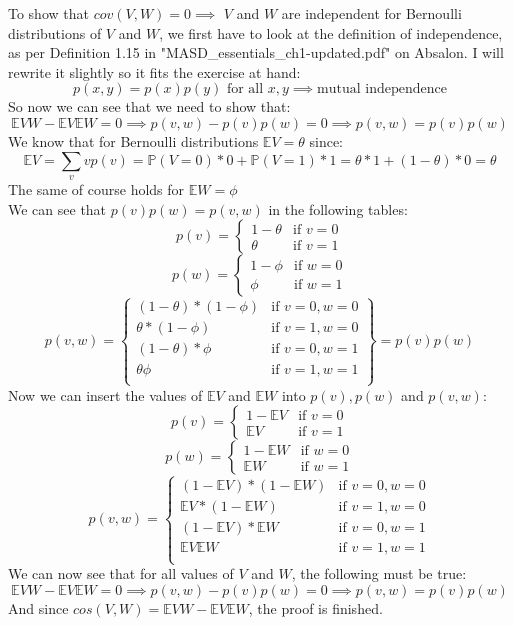 To show that $cov(V,W) = 0 \implies$ $V$ and $W$ are independent for Bernoulli distributions of $V$ and $W$, we first have to look at the definition of independence, as per Definition 1.15 in "MASD\_essentials\_ch1-updated.pdf" on Absalon. I will rewrite it slightly so it fits the exercise at hand:\\
$$
p(x,y)=p(x)p(y) \text{ for all }x,y \implies \text{mutual independence}
$$
So now we can see that we need to show that:
$$
\mathbb{E}VW-\mathbb{E}V \mathbb{E}W = 0 \implies p(v,w)-p(v)p(w) = 0 \implies p(v,w) = p(v)p(w)
$$
We know that for Bernoulli distributions $\mathbb{E}V = \theta$ since:
$$
\mathbb{E}V = \sum_v vp(v) = \mathbb{P}(V=0)*0+\mathbb{P}(V=1)*1 = \theta*1+(1-\theta)*0 = \theta
$$
The same of course holds for $\mathbb{E}W = \phi$\\
We can see that $p(v)p(w) = p(v,w)$ in the following tables:
$$
p(v) =
\left\{
\begin{array}{ll}
1 - \theta & \text{if } v=0\\
\theta     & \text{if } v=1
\end{array}
\right.
$$
$$
p(w) =
\left\{
\begin{array}{ll}
1 - \phi & \text{if } w=0\\
\phi     & \text{if } w=1
\end{array}
\right.
$$
$$
p(v,w) =
\left\{
\begin{array}{ll}
(1 - \theta)*(1-\phi) & \text{if } v=0,w=0\\
\theta*(1-\phi)       & \text{if } v=1,w=0\\
(1-\theta)*\phi       & \text{if } v=0,w=1\\
\theta \phi           & \text{if } v=1,w=1\\
\end{array}
\right\}
= p(v)p(w)
$$
Now we can insert the values of $\mathbb{E}V$ and $\mathbb{E}W$ into $p(v),p(w)$ and $p(v,w)$:
$$
p(v) =
\left\{
\begin{array}{ll}
1 - \mathbb{E}V & \text{if } v=0\\
\mathbb{E}V     & \text{if } v=1
\end{array}
\right.
$$
$$
p(w) =
\left\{
\begin{array}{ll}
1 - \mathbb{E}W & \text{if } w=0\\
\mathbb{E}W     & \text{if } w=1
\end{array}
\right.
$$
$$
p(v,w) =
\left\{
\begin{array}{ll}
(1 - \mathbb{E}V)*(1-\mathbb{E}W) & \text{if } v=0,w=0\\
\mathbb{E}V*(1-\mathbb{E}W)       & \text{if } v=1,w=0\\
(1-\mathbb{E}V)*\mathbb{E}W       & \text{if } v=0,w=1\\
\mathbb{E}V \mathbb{E}W           & \text{if } v=1,w=1\\
\end{array}
\right.
$$
We can now see that for all values of $V$ and $W$, the following must be true:
$$
\mathbb{E}VW-\mathbb{E}V \mathbb{E}W = 0 \implies p(v,w)-p(v)p(w) = 0 \implies p(v,w) = p(v)p(w)
$$
And since $cos(V,W)= \mathbb{E}VW-\mathbb{E}V \mathbb{E}W$, the proof is finished.
